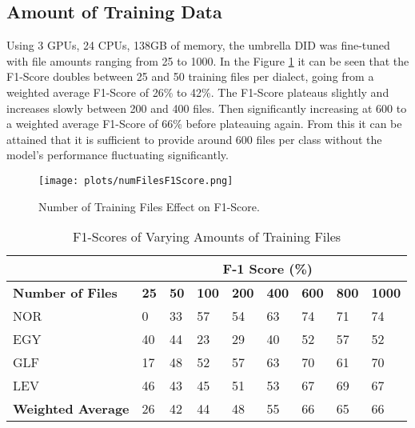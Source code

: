 \subsection{Amount of Training Data}\label{sect:MinTrainingData}
Using 3 GPUs, 24 CPUs, 138GB of memory, the umbrella DID was fine-tuned with file amounts ranging from 25 to 1000. In the Figure 
\ref{fig:numFilesF1Score} it can be seen that the F1-Score doubles between 25 and 50 training files per dialect, going from a weighted average F1-Score 
of 26\% to 42\%. The F1-Score plateaus slightly and increases slowly between 200 and 400 files. Then significantly increasing at 600 to a weighted average F1-Score of 
66\% before plateauing again. From this it can be attained that it is sufficient to provide around 600 files per class without the model's performance fluctuating significantly. 
\begin{figure}[h!]
    \centering
    \texttt{[image: plots/numFilesF1Score.png]}
    \caption{Number of Training Files Effect on F1-Score.}
    \label{fig:numFilesF1Score}
\end{figure}

\begin{table}[h!]
    \label{tab:f1numfiles}
    \centering
    \caption{F1-Scores of Varying Amounts of Training Files}
    \begin{tabular}{|l|l|l|l|l|l|l|l|l|} 
    \hline
                              & \multicolumn{8}{c|}{\textbf{F-1 Score (\%)~}}                                                                         \\ 
    \hline
    \textbf{Number of Files}  & \textbf{25} & \textbf{50} & \textbf{100} & \textbf{200} & \textbf{400} & \textbf{600} & \textbf{800} & \textbf{1000}  \\ 
    \hline
    NOR                       & 0           & 33          & 57           & 54           & 63           & 74           & 71           & 74             \\ 
    \hline
    EGY                       & 40          & 44          & 23           & 29           & 40           & 52           & 57           & 52             \\ 
    \hline
    GLF                       & 17          & 48          & 52           & 57           & 63           & 70           & 61           & 70             \\ 
    \hline
    LEV                       & 46          & 43          & 45           & 51           & 53           & 67           & 69           & 67             \\ 
    \hline
    \textbf{Weighted Average} & 26          & 42          & 44           & 48           & 55           & 66           & 65           & 66             \\
    \hline
    \end{tabular}
    \end{table}

